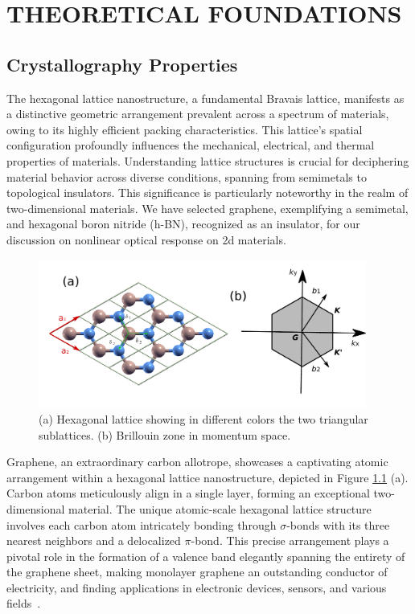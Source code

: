 \chapter{THEORETICAL FOUNDATIONS} 
\label{ch:ch2}
\section{Crystallography Properties}
The hexagonal lattice nanostructure, a fundamental Bravais lattice, manifests as a distinctive geometric arrangement prevalent across a spectrum of materials, owing to its highly efficient packing characteristics. This lattice's spatial configuration profoundly influences the mechanical, electrical, and thermal properties of materials. Understanding lattice structures is crucial for deciphering material behavior across diverse conditions, spanning from semimetals to topological insulators. This significance is particularly noteworthy in the realm of two-dimensional materials. We have selected graphene, exemplifying a semimetal, and hexagonal boron nitride (h-BN), recognized as an insulator, for our discussion on nonlinear optical response on 2d materials.\\
\begin{figure}[htpb]
    \centering
    \includegraphics[width=0.96\textwidth]{pic/lattice.pdf}
    \caption[Lab coordinate system]{(a) Hexagonal lattice showing in different colors the two triangular sublattices. (b) Brillouin zone in momentum space.}
    \label{fig: lattice}
\end{figure}
Graphene, an extraordinary carbon allotrope, showcases a captivating atomic arrangement within a
hexagonal lattice nanostructure, depicted in Figure \ref{fig: lattice} (a). Carbon atoms
meticulously align in a single layer, forming an exceptional two-dimensional material. The unique
atomic-scale hexagonal lattice structure involves each carbon atom intricately bonding through
$\sigma$-bonds with its three nearest neighbors and a delocalized $\pi$-bond. This precise
arrangement plays a pivotal role in the formation of a valence band elegantly spanning the entirety
of the graphene sheet, making monolayer graphene an outstanding conductor of electricity, and
finding applications in electronic devices, sensors, and various fields~\cite{sarma2011electronic}.

